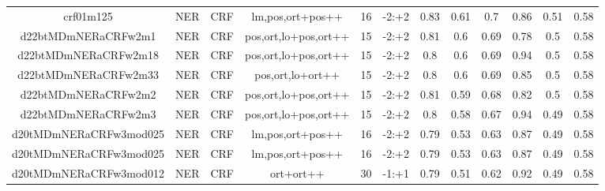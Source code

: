 \documentclass[a4paper]{article}
\begin{document}
\begin{landscape}
\begin{center}
\begin{tabular}{ |c|c|c|c|c|c|c|c|c|c|c|c|}
 
 	
 	\small{ crf01m125 } & \small{ NER} & \small{  CRF }  & lm,pos,ort+pos++  &  16 &  \small{  -2:+2 }  &  0.83 & 0.61 & 0.7  &  0.86 & 0.51 & 0.58 \\
 	

 
 	
 	\small{ d22btMDmNERaCRFw2m1 } & \small{ NER} & \small{  CRF }  & pos,ort,lo+pos,ort++  &  15 &  \small{  -2:+2 }  &  0.81 & 0.6 & 0.69  &  0.78 & 0.5 & 0.58 \\
 	

 
 	
 	\small{ d22btMDmNERaCRFw2m18 } & \small{ NER} & \small{  CRF }  & pos,ort,lo+pos,ort++  &  15 &  \small{  -2:+2 }  &  0.8 & 0.6 & 0.69  &  0.94 & 0.5 & 0.58 \\
 	

 
 	
 	\small{ d22btMDmNERaCRFw2m33 } & \small{ NER} & \small{  CRF }  & pos,ort,lo+ort++  &  15 &  \small{  -2:+2 }  &  0.8 & 0.6 & 0.69  &  0.85 & 0.5 & 0.58 \\
 	

 
 	
 	\small{ d22btMDmNERaCRFw2m2 } & \small{ NER} & \small{  CRF }  & pos,ort,lo+pos,ort++  &  15 &  \small{  -2:+2 }  &  0.81 & 0.59 & 0.68  &  0.82 & 0.5 & 0.58 \\
 	

 
 	
 	\small{ d22btMDmNERaCRFw2m3 } & \small{ NER} & \small{  CRF }  & pos,ort,lo+pos,ort++  &  15 &  \small{  -2:+2 }  &  0.8 & 0.58 & 0.67  &  0.94 & 0.49 & 0.58 \\
 	

 
 	
 	\small{ d20tMDmNERaCRFw3mod025 } & \small{ NER} & \small{  CRF }  & lm,pos,ort+pos++  &  16 &  \small{  -2:+2 }  &  0.79 & 0.53 & 0.63  &  0.87 & 0.49 & 0.58 \\
 	

 
 	
 	\small{ d20tMDmNERaCRFw3mod025 } & \small{ NER} & \small{  CRF }  & lm,pos,ort+pos++  &  16 &  \small{  -2:+2 }  &  0.79 & 0.53 & 0.63  &  0.87 & 0.49 & 0.58 \\
 	

 
 	
 	\small{ d20tMDmNERaCRFw3mod012 } & \small{ NER} & \small{  CRF }  & ort+ort++  &  30 &  \small{  -1:+1 }  &  0.79 & 0.51 & 0.62  &  0.92 & 0.49 & 0.58 \\
 	


\end{tabular}
\end{center}
\end{landscape}
\end{document}

